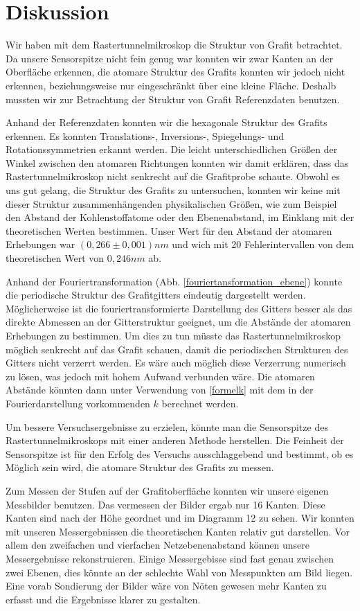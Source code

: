 \documentclass[10pt,a4paper]{article}
\begin{document}
\section{Diskussion}

Wir haben mit dem Rastertunnelmikroskop die Struktur von Grafit betrachtet. Da unsere Sensorspitze nicht fein genug war konnten wir zwar Kanten an der Oberfläche erkennen, die atomare Struktur des Grafits konnten wir jedoch nicht erkennen, beziehungsweise nur eingeschränkt über eine kleine Fläche. Deshalb mussten wir zur Betrachtung der Struktur von Grafit Referenzdaten benutzen.

Anhand der Referenzdaten konnten wir die hexagonale Struktur des Grafits erkennen. Es konnten Translations-, Inversions-, Spiegelungs- und Rotationssymmetrien erkannt werden. Die leicht unterschiedlichen Größen der Winkel zwischen den atomaren Richtungen konnten wir damit erklären, dass das Rastertunnelmikroskop nicht senkrecht auf die Grafitprobe schaute. Obwohl es uns gut gelang, die Struktur des Grafits zu untersuchen, konnten wir keine mit dieser Struktur zusammenhängenden physikalischen Größen, wie zum Beispiel den Abstand der Kohlenstoffatome oder den Ebenenabstand, im Einklang mit der theoretischen Werten bestimmen. Unser Wert für den Abstand der atomaren Erhebungen war $(0,266 \pm 0,001) nm$ und wich mit 20 Fehlerintervallen von dem theoretischen Wert von $0,246 nm$ ab.

Anhand der Fouriertransformation (Abb. \ref{fouriertansformation_ebene}) konnte die periodische Struktur des Grafitgitters eindeutig dargestellt werden. Möglicherweise ist die fouriertransformierte Darstellung des Gitters besser als das direkte Abmessen an der Gitterstruktur geeignet, um die Abstände der atomaren Erhebungen zu bestimmen. Um dies zu tun müsste das Rastertunnelmikroskop möglich senkrecht auf das Grafit schauen, damit die periodischen Strukturen des Gitters nicht verzerrt werden. Es wäre auch möglich diese Verzerrung numerisch zu lösen, was jedoch mit hohem Aufwand verbunden wäre. Die atomaren Abstände könnten dann unter Verwendung von \ref{formelk} mit dem in der Fourierdarstellung vorkommenden $k$ berechnet werden.

Um bessere Versuchsergebnisse zu erzielen, könnte man die Sensorspitze des Rastertunnelmikroskops mit einer anderen Methode herstellen. Die Feinheit der Sensorspitze ist für den Erfolg des Versuchs ausschlaggebend und bestimmt, ob es Möglich sein wird, die atomare Struktur des Grafits zu messen.

Zum Messen der Stufen auf der Grafitoberfläche konnten wir unsere eigenen Messbilder benutzen. Das vermessen der Bilder ergab nur 16 Kanten. Diese Kanten sind nach der Höhe geordnet und im Diagramm 12 zu sehen. Wir konnten mit unseren Messergebnissen die theoretischen Kanten relativ gut darstellen. Vor allem den zweifachen und vierfachen Netzebenenabstand können unsere Messergebnisse rekonstruieren. Einige Messergebisse sind fast genau zwischen zwei Ebenen, dies könnte an der schlechte Wahl von Messpunkten am Bild liegen. Eine vorab Sondierung der Bilder wäre von Nöten gewesen mehr Kanten zu erfasst und die Ergebnisse klarer zu gestalten.
\end{document}
